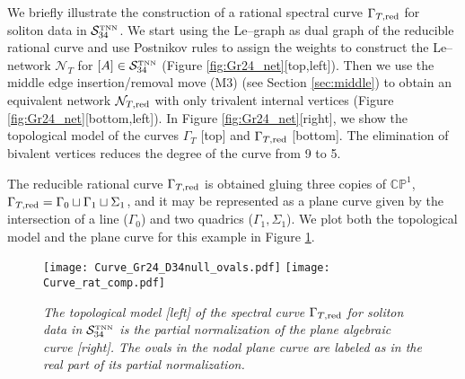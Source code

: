 \documentclass[11pt]{amsart}
\theoremstyle{plain}
\numberwithin{equation}{section}
\begin{document}
We briefly illustrate the construction of a rational spectral curve $\Gamma_{T,\mbox{\scriptsize red}}$ for soliton data in ${\mathcal S}_{34}^{\mbox{\tiny TNN}}$. We start using the Le--graph as dual graph of the reducible rational curve and use Postnikov rules to assign the weights to construct the Le--network $\mathcal N_T$ for $[A]\in {\mathcal S}_{34}^{\mbox{\tiny TNN}}$  (Figure \ref{fig:Gr24_net}[top,left]). Then we use the middle edge insertion/removal move (M3) (see Section \ref{sec:middle}) to obtain an equivalent network $\mathcal N_{T,\mbox{\scriptsize red}}$ with only trivalent internal vertices (Figure \ref{fig:Gr24_net}[bottom,left]). In Figure \ref{fig:Gr24_net}[right], we show the topological model of the curves $\Gamma_{T}$ [top] and $\Gamma_{T,\mbox{\scriptsize red}}$ [bottom]. The elimination of bivalent vertices reduces the degree of the curve from 9 to 5. 

The reducible rational curve $\Gamma_{T,\mbox{\scriptsize red}}$ is obtained gluing three copies of $\mathbb{CP}^1$, $\Gamma_{T,\mbox{\scriptsize red}}=\Gamma_0\sqcup \Gamma_{1}\sqcup\Sigma_{1}$, and it may be represented as a plane curve given by the intersection of a line ($\Gamma_0$) and two quadrics ($\Gamma_1,\Sigma_1$). We plot both the topological model and the plane curve for this example in Figure \ref{fig:gr24_top_2}. 

\begin{figure}%
  \centering
  {\texttt{[image: Curve\_Gr24\_D34null\_ovals.pdf]}}
  \hspace{.6 truecm}
  {\texttt{[image: Curve\_rat\_comp.pdf]}}
\caption{\footnotesize{\sl The topological model [left] of the spectral curve $\Gamma_{T,\mbox{\scriptsize red}}$ for soliton data in ${\mathcal S}_{34}^{\mbox{\tiny TNN}}$ is the partial normalization of the plane algebraic curve [right]. The ovals in the nodal plane curve are labeled as in the real part of its partial normalization. }}\label{fig:gr24_top_2}        
\end{figure}
\end{document}
